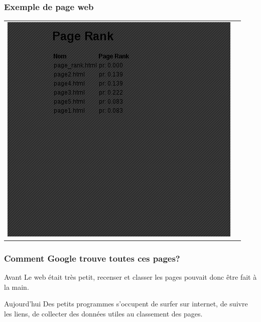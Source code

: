 \documentclass{beamer}
\begin{document}
\begin{frame}
  \frametitle{Exemple de page web}
  \begin{tabular}{cc}
    \begin{minipage}{0.37\linewidth}\includegraphics[scale=0.3]{exemple_web}\end{minipage} & \begin{minipage}{0.4\linewidth}\end{minipage}
    
\end{tabular}

\end{frame}

\begin{frame}
  \frametitle{Comment Google trouve toutes ces pages?}

  
  \begin{block}{Avant}
    Le web était très petit, recenser et classer les pages pouvait
    donc être fait à la main.
  \end{block}
  
  \pause

  \begin{block}{Aujourd'hui}
    Des petits programmes s'occupent de surfer sur internet, de suivre
    les liens, de collecter des données utiles au classement des
    pages.
  \end{block}


\end{frame}
\end{document}

